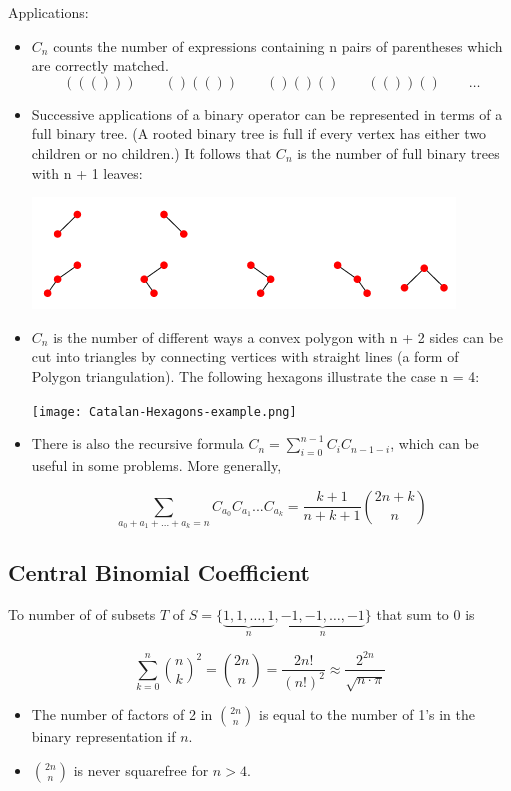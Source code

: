 Applications:
\begin{itemize}

\item $C_n$ counts the number of expressions containing n pairs of parentheses which are correctly matched.
    $$((()))  \qquad  ()(())  \qquad  ()()()  \qquad  (())()  \qquad  \dots $$


\item Successive applications of a binary operator can be represented in terms of a full binary tree. (A rooted binary tree is full if every vertex has either two children or no children.) It follows that $C_n$ is the number of full binary trees with n + 1 leaves:\\
\begin{center}
\includegraphics[scale=0.5]{img/catalan_tree.png}
\end{center}

\item $C_n$ is the number of different ways a convex polygon with n + 2 sides can be cut into triangles by connecting vertices with straight lines (a form of Polygon triangulation). The following hexagons illustrate the case n = 4:

\begin{center}
\texttt{[image: Catalan-Hexagons-example.png]}
\end{center}

\item There is also the recursive formula $C_n = \displaystyle\sum_{i=0}^{n - 1} C_i C_{n - 1 - i}$, which can be useful in some problems. More generally,

$$
\displaystyle\sum_{a_0+a_1+...+a_{k} = n}{C_{a_0} C_{a_1} ... C_{a_{k}}} = \displaystyle\frac{k+1}{n+k+1}\displaystyle{2n+k \choose n}
$$

\end{itemize}

\subsection{Central Binomial Coefficient}

To number of of subsets $T$ of $S = \{ \underbrace{1, 1, \dots, 1}_{n}, \underbrace{-1, -1, \dots, -1}_{n} \}$ that sum to 0 is

$$ \sum_{k=0}^n \binom{n}{k}^2 = \binom{2n}{n} = \frac{2n!}{\left(n!\right)^2} \approx \frac{2^{2n}}{\sqrt{n \cdot \pi}} $$

\begin{itemize}
    \item  The number of factors of 2 in $\binom{2n}{n}$ is equal to the number of 1's in the binary representation if $n$.
    
    \item $\binom{2n}{n}$ is never squarefree for $n > 4$.
\end{itemize}

